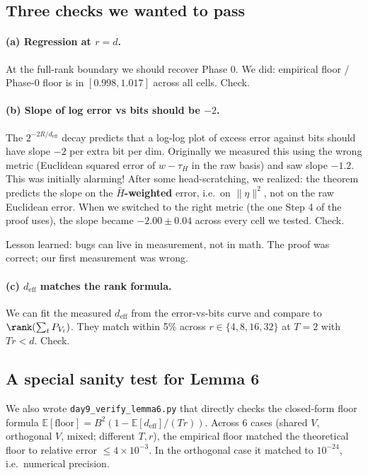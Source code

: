 \documentclass[11pt]{article}
\newcommand{\E}{\mathbb{E}}
\newcommand{\tauH}{\tau_{\!H}}
\newcommand{\deff}{d_{\mathrm{eff}}}
\newcommand{\Hbar}{\bar H}
\begin{document}
\subsection{Three checks we wanted to pass}

\paragraph{(a) Regression at $r=d$.} At the full-rank boundary we
should recover Phase 0. We did: empirical floor / Phase-0 floor is in
$[0.998, 1.017]$ across all cells. Check.

\paragraph{(b) Slope of log error vs bits should be $-2$.} The
$2^{-2R/\deff}$ decay predicts that a log-log plot of excess error
against bits should have slope $-2$ per extra bit per dim. Originally
we measured this using the wrong metric (Euclidean squared error of
$w - \tauH$ in the raw basis) and saw slope $-1.2$. This was initially
alarming! After some head-scratching, we realized: the theorem
predicts the slope on the \textbf{$\Hbar$-weighted} error, i.e.\ on
$\|\eta\|^2$, not on the raw Euclidean error. When we switched to the
right metric (the one Step 4 of the proof uses), the slope became
$-2.00\pm 0.04$ across every cell we tested. Check.

Lesson learned: bugs can live in measurement, not in math. The proof
was correct; our first measurement was wrong.

\paragraph{(c) $\deff$ matches the rank formula.} We can fit the
measured $\deff$ from the error-vs-bits curve and compare to
$\rank(\sum_t P_{V_t})$. They match within 5\% across $r \in
\{4, 8, 16, 32\}$ at $T = 2$ with $Tr < d$. Check.

\subsection{A special sanity test for Lemma 6}

We also wrote \texttt{day9\_verify\_lemma6.py} that directly checks the
closed-form floor formula $\E[\text{floor}] = B^2(1 - \E[\deff]/(Tr))$.
Across 6 cases (shared $V$, orthogonal $V$, mixed; different $T, r$),
the empirical floor matched the theoretical floor to relative error
$\leq 4\times 10^{-3}$. In the orthogonal case it matched to
$10^{-24}$, i.e.\ numerical precision.
\end{document}
